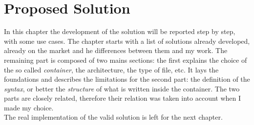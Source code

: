 %
%
\chapter{Proposed Solution}
%
\label{cap:proposedsolution}
%
%
%
In this chapter the development of the solution will be reported step by step, with some use cases. The chapter starts with a list of solutions already developed, already on the market and he differences between them and my work. The remaining part is composed of two mains sections: the first explains the choice of the so called \textit{container}, the architecture, the type of file, etc. It lays the foundations and describes the limitations for the second part: the definition of the \textit{syntax}, or better the \textit{structure} of what is written inside the container. The two parts are closely related, therefore  their relation was taken into account when I made my choice. 
 \\
The real implementation of the valid solution is left for the next chapter.

